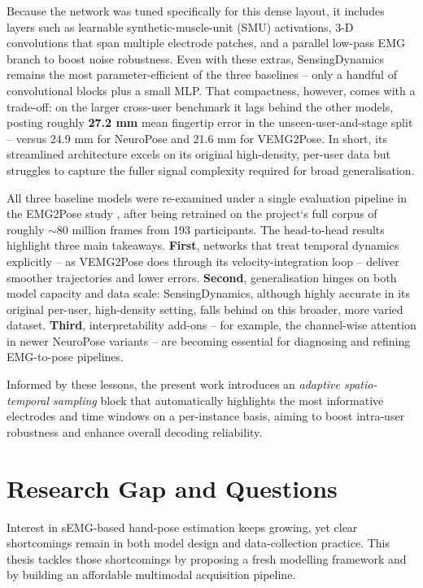 Because the network was tuned specifically for this dense layout, it includes layers such as learnable synthetic-muscle-unit (SMU) activations, 3-D convolutions that span multiple electrode patches, and a parallel low-pass EMG branch to boost noise robustness. Even with these extras, SensingDynamics remains the most parameter-efficient of the three baselines -- only a handful of convolutional blocks plus a small MLP. That compactness, however, comes with a trade-off: on the larger cross-user benchmark it lags behind the other models, posting roughly \textbf{27.2 mm} mean fingertip error in the unseen-user-and-stage split -- versus 24.9 mm for NeuroPose and 21.6 mm for VEMG2Pose. In short, its streamlined architecture excels on its original high-density, per-user data but struggles to capture the fuller signal complexity required for broad generalisation.

All three baseline models were re-examined under a single evaluation pipeline in the EMG2Pose study \cite{salter2024emg2pose}, after being retrained on the project`s full corpus of roughly \(\sim\!80\) million frames from 193 participants. The head-to-head results highlight three main takeaways.  
\textbf{First}, networks that treat temporal dynamics explicitly -- as VEMG2Pose does through its velocity-integration loop -- deliver smoother trajectories and lower errors.  
\textbf{Second}, generalisation hinges on both model capacity and data scale: SensingDynamics, although highly accurate in its original per-user, high-density setting, falls behind on this broader, more varied dataset.  
\textbf{Third}, interpretability add-ons -- for example, the channel-wise attention in newer NeuroPose variants -- are becoming essential for diagnosing and refining EMG-to-pose pipelines.  

Informed by these lessons, the present work introduces an \emph{adaptive spatio-temporal sampling} block that automatically highlights the most informative electrodes and time windows on a per-instance basis, aiming to boost intra-user robustness and enhance overall decoding reliability.

\section{Research Gap and Questions}

Interest in sEMG-based hand-pose estimation keeps growing, yet clear shortcomings remain in both model design and data-collection practice. This thesis tackles those shortcomings by proposing a fresh modelling framework and by building an affordable multimodal acquisition pipeline.

